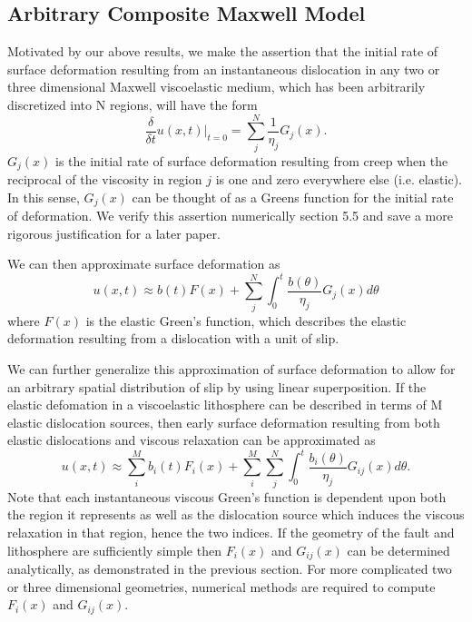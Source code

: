 \documentclass[12pt]{article}
\begin{document}
\subsection{Arbitrary Composite Maxwell Model}
Motivated by our above results, we make the assertion that the initial
rate of surface deformation resulting from an instantaneous
dislocation in any two or three dimensional Maxwell viscoelastic
medium, which has been arbitrarily discretized into N regions, will
have the form
\begin{equation}\label{PostseismicInitialVelocity}
  \frac{\delta}{\delta t}u(x,t)\big|_{t=0} = \sum_j^N\frac{1}{\eta_j}G_j(x).
\end{equation}
$G_j(x)$ is the initial rate of surface deformation resulting from
creep when the reciprocal of the viscosity in region $j$ is one and
zero everywhere else (i.e. elastic).  In this sense, $G_j(x)$ can be
thought of as a Greens function for the initial rate of deformation.
We verify this assertion numerically section 5.5 and save a more
rigorous justification for a later paper.

We can then approximate surface deformation as
\begin{equation}
  u(x,t) \approx b(t)F(x) + \sum_j^N\int_0^t \frac{b(\theta)}{\eta_j}G_j(x) d\theta
\end{equation}
where $F(x)$ is the elastic Green's function, which describes the
elastic deformation resulting from a dislocation with a unit of slip.

We can further generalize this approximation of surface deformation to
allow for an arbitrary spatial distribution of slip by using linear
superposition.  If the elastic defomation in a viscoelastic
lithosphere can be described in terms of M elastic dislocation
sources, then early surface deformation resulting from both elastic
dislocations and viscous relaxation can be approximated as
\begin{equation}\label{Postseismic_Approximation}
u(x,t) \approx \sum_i^Mb_i(t)F_i(x) + 
               \sum_i^M\sum_j^N\int_0^t\frac{b_i(\theta)}{\eta_j}G_{ij}(x) d\theta.
\end{equation}
Note that each instantaneous viscous Green's function is dependent
upon both the region it represents as well as the dislocation source
which induces the viscous relaxation in that region, hence the two
indices.  If the geometry of the fault and lithosphere are
sufficiently simple then $F_i(x)$ and $G_{ij}(x)$ can be determined
analytically, as demonstrated in the previous section.  For more
complicated two or three dimensional geometries, numerical methods are
required to compute $F_i(x)$ and $G_{ij}(x)$.
\end{document}
